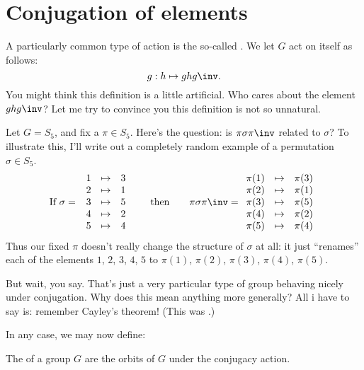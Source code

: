 \section{Conjugation of elements}
A particularly common type of action is the so-called .
We let $G$ act on itself as follows:
\[ g : h \mapsto ghg\inv. \]
You might think this definition is a little artificial.
Who cares about the element $ghg\inv$?
Let me try to convince you this definition is not so unnatural.
\begin{example}
	[Conjugacy in $S_n$]
	Let $G = S_5$, and fix a $\pi \in S_5$.
	Here's the question: is $\pi \sigma \pi \inv$ related to $\sigma$?
	To illustrate this,
	I'll write out a completely random example of a permutation $\sigma \in S_5$.
	\[
		\text{If }
		\sigma = \;
		\begin{array}{ccc}
		1 & \mapsto & 3 \\
		2 & \mapsto & 1 \\
		3 & \mapsto & 5 \\
		4 & \mapsto & 2 \\
		5 & \mapsto & 4
		\end{array}
		\qquad
		\text{then}
		\qquad
		\pi \sigma \pi\inv = 
		\begin{array}{ccc}
		\pi(1) & \mapsto & \pi(3) \\
		\pi(2) & \mapsto & \pi(1) \\
		\pi(3) & \mapsto & \pi(5) \\
		\pi(4) & \mapsto & \pi(2) \\
		\pi(5) & \mapsto & \pi(4)
		\end{array}
	\]
	Thus our fixed $\pi$ doesn't really change the structure of $\sigma$ at all:
	it just ``renames'' each of the elements $1$, $2$, $3$, $4$, $5$
	to $\pi(1)$, $\pi(2)$, $\pi(3)$, $\pi(4)$, $\pi(5)$.
\end{example}
But wait, you say.
That's just a very particular type of group behaving nicely under conjugation.
Why does this mean anything more generally?
All i have to say is: remember Cayley's theorem!
(This was .)

In any case, we may now define:
\begin{definition}
	The  of a group $G$ are the orbits of $G$ under
	the conjugacy action.
\end{definition}

